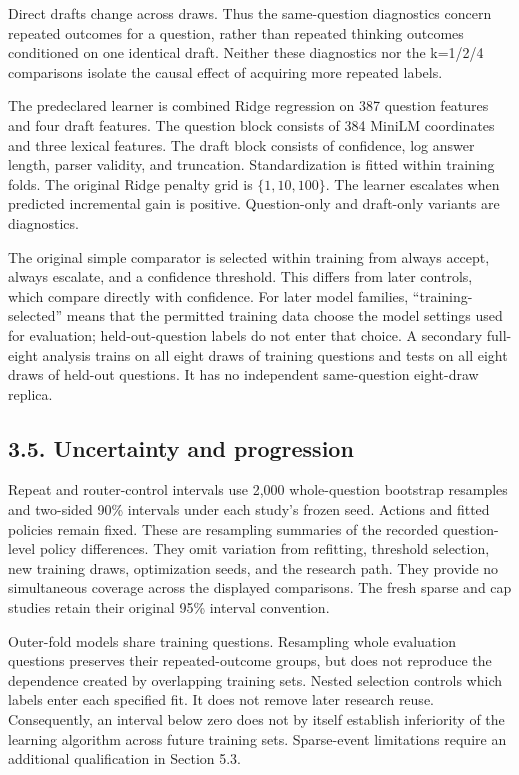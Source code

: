 \documentclass[11pt,a4paper]{article}
\begin{document}
Direct drafts change across draws. Thus the same-question diagnostics concern repeated outcomes for a question, rather than repeated thinking outcomes conditioned on one identical draft. Neither these diagnostics nor the k=1/2/4 comparisons isolate the causal effect of acquiring more repeated labels.

The predeclared learner is combined Ridge regression on 387 question features and four draft features. The question block consists of 384 MiniLM coordinates and three lexical features. The draft block consists of confidence, log answer length, parser validity, and truncation. Standardization is fitted within training folds. The original Ridge penalty grid is \(\{1,10,100\}\). The learner escalates when predicted incremental gain is positive. Question-only and draft-only variants are diagnostics.

The original simple comparator is selected within training from always accept, always escalate, and a confidence threshold. This differs from later controls, which compare directly with confidence. For later model families, ``training-selected'' means that the permitted training data choose the model settings used for evaluation; held-out-question labels do not enter that choice. A secondary full-eight analysis trains on all eight draws of training questions and tests on all eight draws of held-out questions. It has no independent same-question eight-draw replica.

\subsection*{3.5. Uncertainty and progression}\label{sec:35-uncertainty-and-progression}
Repeat and router-control intervals use 2,000 whole-question bootstrap resamples and two-sided 90\% intervals under each study's frozen seed. Actions and fitted policies remain fixed. These are resampling summaries of the recorded question-level policy differences. They omit variation from refitting, threshold selection, new training draws, optimization seeds, and the research path. They provide no simultaneous coverage across the displayed comparisons. The fresh sparse and cap studies retain their original 95\% interval convention.

Outer-fold models share training questions. Resampling whole evaluation questions preserves their repeated-outcome groups, but does not reproduce the dependence created by overlapping training sets. Nested selection controls which labels enter each specified fit. It does not remove later research reuse. Consequently, an interval below zero does not by itself establish inferiority of the learning algorithm across future training sets. Sparse-event limitations require an additional qualification in Section 5.3.
\end{document}
